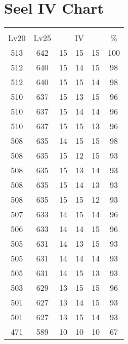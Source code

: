 \documentclass{article}%
\begin{document}
%
\normalsize%
\section{Seel IV Chart}%
\label{sec:Seel IV Chart}%
\renewcommand{\arraystretch}{1.5}%
\begin{tabular}{|c|c|c|c|c|c|}%
\hline%
\multicolumn{6}{|c|}{\textcolor{white}{ 
\linebreak{Seel}
}%
\cellcolor{black}}\\%
\multicolumn{1}{|c}{Lv20}&\multicolumn{1}{c|}{Lv25}&\multicolumn{3}{c|}{IV}&\multicolumn{1}{|c|}{\%}\\%
\hline%
\rowcolor{color100}%
513&642&15&15&15&100\\%
\hline%
\rowcolor{color98}%
512&640&15&14&15&98\\%
\hline%
\rowcolor{color98}%
512&640&15&15&14&98\\%
\hline%
\rowcolor{color96}%
510&637&15&13&15&96\\%
\hline%
\rowcolor{color96}%
510&637&15&14&14&96\\%
\hline%
\rowcolor{color96}%
510&637&15&15&13&96\\%
\hline%
\rowcolor{color98}%
508&635&14&15&15&98\\%
\hline%
\rowcolor{color93}%
508&635&15&12&15&93\\%
\hline%
\rowcolor{color93}%
508&635&15&13&14&93\\%
\hline%
\rowcolor{color93}%
508&635&15&14&13&93\\%
\hline%
\rowcolor{color93}%
508&635&15&15&12&93\\%
\hline%
\rowcolor{color96}%
507&633&14&15&14&96\\%
\hline%
\rowcolor{color96}%
506&633&14&14&15&96\\%
\hline%
\rowcolor{color93}%
505&631&14&13&15&93\\%
\hline%
\rowcolor{color93}%
505&631&14&14&14&93\\%
\hline%
\rowcolor{color93}%
505&631&14&15&13&93\\%
\hline%
\rowcolor{color96}%
503&629&13&15&15&96\\%
\hline%
\rowcolor{color93}%
501&627&13&14&15&93\\%
\hline%
\rowcolor{color93}%
501&627&13&15&14&93\\%
\hline%
\rowcolor{color91}%
471&589&10&10&10&67\\%
\end{tabular}

%
\end{document}

